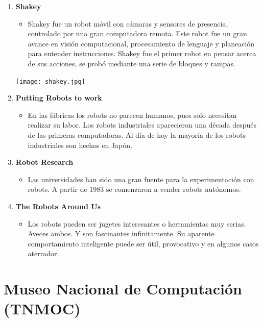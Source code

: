 \documentclass{report}
\begin{document}
\begin{enumerate}
\begin{enumerate}
\begin{itemize}
		\end{itemize}
	\item \textbf{Shakey}
		\begin{itemize}
			\item Shakey fue un robot móvil con cámaras y sensores de presencia, controlado por una gran computadora remota. Este robot fue un gran avance en visión computacional, procesamiento de lenguaje y planeación para entender instrucciones. Shakey fue el primer robot en pensar acerca de sus acciones, se probó mediante una serie de bloques y rampas.
		\end{itemize}
	\begin{center}	
		 \texttt{[image: shakey.jpg]}
	\end{center}
	\item \textbf{Putting Robots to work}	
		\begin{itemize}
			\item En las fábricas los robots no parecen humanos, pues solo necesitan realizar su labor. Los robots industriales aparecieron una década después de las primeras computadoras. Al día de hoy la mayoría de los robots industriales son hechos en Japón.
		\end{itemize}
	\item \textbf{Robot Research}
		\begin{itemize}
			\item Las universidades han sido una gran fuente para la experimentación con robots. A partir de 1983 se comenzaron a vender robots autónomos.
		\end{itemize}
	\item \textbf{The Robots Around Us}
		\begin{itemize}
			\item Los robots pueden ser jugetes interesantes o herramientas muy serias. Aveces ambos. Y son fascinantes infinitamente. Su aparente comportamiento inteligente puede ser útil, provocativo y en algunos casos aterrador.
		\end{itemize}
    \end{enumerate}

\section*{Museo Nacional de Computación (TNMOC)}

\end{enumerate}
\end{document}

